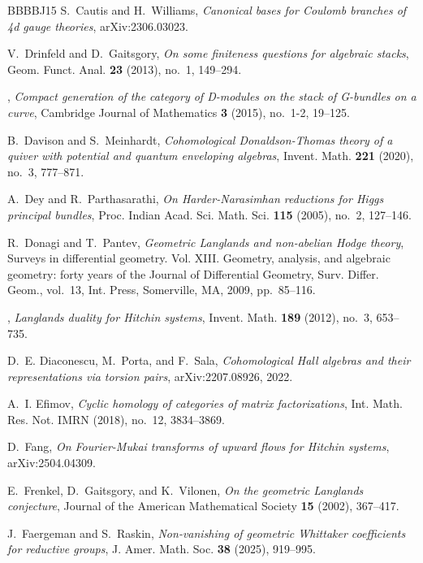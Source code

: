 \documentclass [11pt,oneside,a4paper,mathscr]{amsart}
\theoremstyle{definition}
\begin{document}
\begin{thebibliography}{BBBBJ15}
S.~Cautis and H.~Williams, \emph{Canonical bases for {C}oulomb branches of 4d gauge theories}, arXiv:2306.03023.

V.~Drinfeld and D.~Gaitsgory, \emph{On some finiteness questions for algebraic stacks}, Geom. Funct. Anal. \textbf{23} (2013), no.~1, 149--294.

\bysame, \emph{Compact generation of the category of {D}-modules on the stack of {G}-bundles on a curve}, Cambridge Journal of Mathematics \textbf{3} (2015), no.~1-2, 19--125.

B.~Davison and S.~Meinhardt, \emph{Cohomological {D}onaldson-{T}homas theory of a quiver with potential and quantum enveloping algebras}, Invent. Math. \textbf{221} (2020), no.~3, 777--871.

A.~Dey and R.~Parthasarathi, \emph{On {H}arder-{N}arasimhan reductions for {H}iggs principal bundles}, Proc. Indian Acad. Sci. Math. Sci. \textbf{115} (2005), no.~2, 127--146.

R.~Donagi and T.~Pantev, \emph{Geometric {L}anglands and non-abelian {H}odge theory}, Surveys in differential geometry. {V}ol. {XIII}. {G}eometry, analysis, and algebraic geometry: forty years of the {J}ournal of {D}ifferential {G}eometry, Surv. Differ. Geom., vol.~13, Int. Press, Somerville, MA, 2009, pp.~85--116.

\bysame, \emph{Langlands duality for {H}itchin systems}, Invent. Math. \textbf{189} (2012), no.~3, 653--735.

D.~E. Diaconescu, M.~Porta, and F.~Sala, \emph{Cohomological {H}all algebras and their representations via torsion pairs}, arXiv:2207.08926, 2022.

A.~I. Efimov, \emph{Cyclic homology of categories of matrix factorizations}, Int. Math. Res. Not. IMRN (2018), no.~12, 3834--3869.

D.~Fang, \emph{On {F}ourier-{M}ukai transforms of upward flows for {H}itchin systems}, arXiv:2504.04309.

E.~Frenkel, D.~Gaitsgory, and K.~Vilonen, \emph{On the geometric {L}anglands conjecture}, Journal of the American Mathematical Society \textbf{15} (2002), 367--417.

J.~Faergeman and S.~Raskin, \emph{Non-vanishing of geometric {W}hittaker coefficients for reductive groups}, J. Amer. Math. Soc. \textbf{38} (2025), 919--995.


\end{thebibliography}
\end{document}
